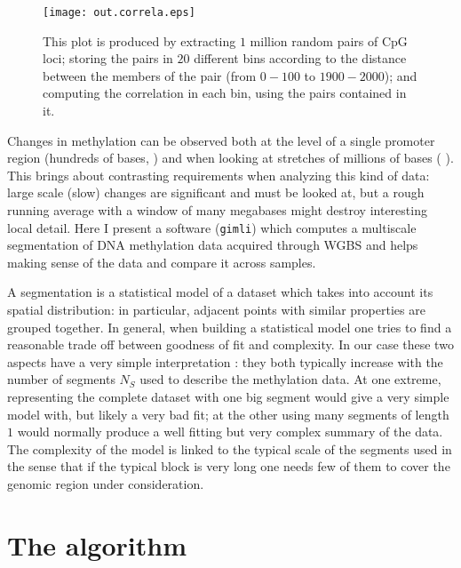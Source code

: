 \documentclass[12pt]{amsart}
\newcommand{\gimli}{\texttt{gimli}}
\begin{document}
\begin{center}
\begin{figure}\label{fig_corr}
\texttt{[image: out.correla.eps]}
\caption{This plot is produced by extracting $1$ million random pairs of CpG loci;
storing the pairs in $20$ different bins  according to the distance between the members
of the pair (from $0-100$ to $1900-2000$); and computing the correlation in each bin,
using the pairs contained in it.}
\end{figure}
\end{center}

 
Changes in methylation can be observed both at the level of a single promoter
region (hundreds of bases, \cite{methylseekr}) and when looking at stretches
of millions of bases (\cite{largeblocks} ).
This brings about contrasting requirements when analyzing this kind of data: large scale (slow) changes are 
significant and must be looked at, but a rough
running average with a window of many megabases might destroy interesting
local detail. Here I present  a software (\gimli) which computes a multiscale segmentation 
of DNA methylation 
data acquired through WGBS and helps making sense of the data and compare 
it across samples.

A segmentation is a statistical model of a dataset  which takes into account its spatial distribution:
in particular, adjacent points with similar properties are grouped together.
In general, when building a statistical model one tries to find a reasonable 
trade off between goodness of fit and complexity.
In our case these two aspects have a very simple interpretation : they both typically 
increase with the number of segments $N_S$ used to describe the 
methylation data.  
At one extreme, representing the complete dataset with one big segment would 
give a very simple model with, but likely a very bad fit;  
at the other using many segments of length $1$ would normally produce
a well fitting but very complex summary of the data.
The complexity of the model is linked to the typical scale of the segments used
in the sense that if the typical block is very long one needs few of them to 
cover the genomic region under consideration.

\section{The algorithm}
\end{document}
